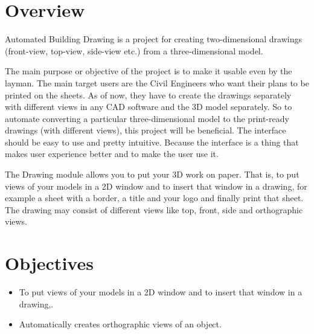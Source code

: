 \section{Overview}
Automated Building Drawing is a project for creating two-dimensional drawings (front-view, top-view, side-view etc.) from a three-dimensional model.

The main purpose or objective of the project is to make it usable even by the layman. The main target users are the Civil Engineers who want their plans to be printed on the sheets. As of now, they have to create the drawings separately with different views in any CAD software and the 3D model separately. So to automate converting a particular three-dimensional model to the print-ready drawings (with different views), this project will be beneficial. The interface should be easy to use and pretty intuitive. Because the interface is a thing that makes user experience better and to make the user use it.

The Drawing module allows you to put your 3D work on paper. That is, to put views of your models in a 2D window and to insert that window in a drawing, for example a sheet with a border, a title and your logo and finally print that sheet. The drawing may consist of different views like top, front, side and orthographic views.

\section{Objectives}
\begin{itemize}
\item To put views of your models in a 2D window and to insert that window in a drawing,.
\item Automatically creates orthographic views of an object.
\end{itemize}


